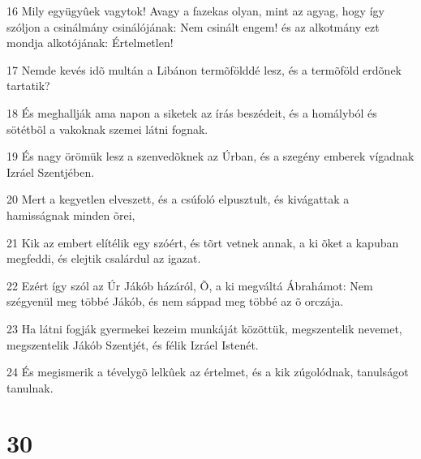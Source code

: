 \par 16 Mily együgyûek vagytok! Avagy a fazekas olyan, mint az agyag, hogy így szóljon a csinálmány csinálójának: Nem csinált engem! és az alkotmány ezt mondja alkotójának: Értelmetlen!
\par 17 Nemde kevés idõ multán a Libánon termõfölddé lesz, és a termõföld erdõnek tartatik?
\par 18 És meghallják ama napon a siketek az írás beszédeit, és a homályból és sötétbõl a vakoknak szemei látni fognak.
\par 19 És nagy örömük lesz a szenvedõknek az Úrban, és a szegény emberek vígadnak Izráel Szentjében.
\par 20 Mert a kegyetlen elveszett, és a csúfoló elpusztult, és kivágattak a hamisságnak minden õrei,
\par 21 Kik az embert elítélik egy szóért, és tõrt vetnek annak, a ki õket a kapuban megfeddi, és elejtik csalárdul az igazat.
\par 22 Ezért így szól az Úr Jákób házáról, Õ, a ki megváltá Ábrahámot: Nem szégyenül meg többé Jákób, és nem sáppad meg többé az õ orczája.
\par 23 Ha látni fogják gyermekei kezeim munkáját közöttük, megszentelik nevemet, megszentelik Jákób Szentjét, és félik Izráel Istenét.
\par 24 És megismerik a tévelygõ lelkûek az értelmet, és a kik zúgolódnak, tanulságot tanulnak.

\chapter{30}

